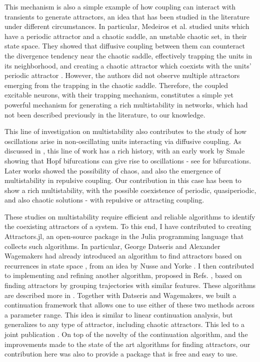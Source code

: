 This mechanism is also a simple example of how coupling can interact with transients to generate attractors, an idea that has been studied in the literature under different circumstances. In particular, Medeiros et al. studied units which have a periodic attractor and a chaotic saddle, an unstable chaotic set, in their state space. They showed that diffusive coupling between them can counteract the divergence tendency near the chaotic saddle, effectively trapping the units in its neighborhood, and creating a chaotic attractor which coexists with the units' periodic attractor \cite{medeiros2018boundaries, medeiros2019state}. However, the authors did not observe multiple attractors emerging from the trapping in the chaotic saddle. Therefore, the coupled excitable neurons, with their trapping mechanism, constitutes a simple yet powerful mechanism for generating a rich multistability in networks, which had not been described previously in the literature, to our knowledge.

This line of investigation on multistability also contributes to the study of how oscillations arise in non-oscillating units interacting via diffusive coupling. As discussed in , this line of work has a rich history, with an early work by Smale showing that Hopf bifurcations can give rise to oscillations \cite{smale1976a} - see  for bifurcations. Later works showed the possibility of chaos, and also the emergence of multistability in repulsive coupling. Our contribution in this case has been to show a rich multistability, with the possible coexistence of periodic, quasiperiodic, and also chaotic solutions - with repulsive or attracting coupling. 

These studies on multistability require efficient and reliable algorithms to identify the coexisting attractors of a system. To this end, I have contributed to creating Attractors.jl, an open-source package in the Julia programming language that collects such algorithms. In particular, George Datseris and Alexander Wagemakers had already introduced an algorithm to find attractors based on recurrences in state space \cite{datseris2022effortless}, from an idea by Nusse and Yorke \cite{nusse1994dynamics}. I then contributed to implementing and refining another algorithm, proposed in Refs. \cite{stender2021bstab, gelbrecht2020monte}, based on finding attractors by grouping trajectories with similar features. These algorithms are described more in . Together with Datseris and Wagemakers, we built a continuation framework that allows one to use either of these two methods across a parameter range. This idea is similar to linear continuation analysis, but generalizes to any type of attractor, including chaotic attractors. This led to a joint publication \cite{datseris2023framework}. On top of the novelty of the continuation algorithm, and the improvements made to the state of the art algorithms for finding attractors, our contribution here was also to provide a package that is free and easy to use. 

